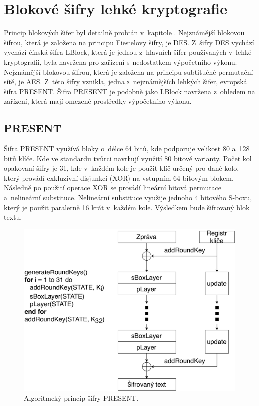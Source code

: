 \section{Blokové šifry lehké kryptografie}
Princip blokových šifer byl detailně probrán v~kapitole . Nejznámější blokovou šifrou, která je založena na principu Fiestelovy šifry, je DES. Z~šifry DES vychází vychází čínská šifra LBlock, která je jednou z~hlavních šifer používaných v~lehké kryptografii, byla navržena pro zařízení s~nedostatkem výpočetního výkonu. Nejznámější blokovou šifrou, která je založena na principu subtitučně-permutační sítě, je AES. Z~této šifry vznikla, jedna z~nejznámějších lehkých šifer, evropská šifra PRESENT. Šifra PRESENT je podobně jako LBlock navržena z~ohledem na zařízení, která mají omezené prostředky výpočetního výkonu. %
\subsection{PRESENT}
Šifra PRESENT využívá bloky o~délce 64 bitů, kde podporuje velikost 80 a~128 bitů klíče. Kde ve standardu tvůrci navrhují využití 80 bitové varianty. Počet kol opakovaní šifry je 31, kde v~každém kole je použit klíč určený pro dané kolo, který provádí exkluzivní disjunkci (XOR) na vstupním 64 bitovým blokem. Následně po použití operace XOR se provádí lineární bitová permutace a~nelineární substituce. Nelineární substituce využije jednoho 4 bitového S-boxu, který je použit paralerně 16 krát v~každém kole. Výsledkem bude šifrovaný blok textu.\cite{PRESENT}
\begin{figure}[!h]
  \begin{center}
    \includegraphics[scale=0.5]{obrazky/present.pdf}
  \end{center}
  \caption[Algoritmcký princip šifry PRESENT]{Algoritmcký princip šifry PRESENT.\cite{PRESENT}}
  \label{img:present}
\end{figure}

